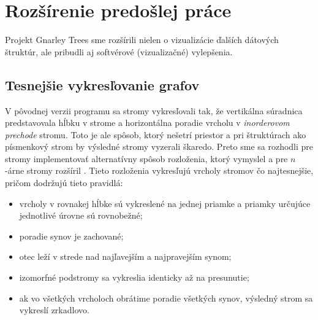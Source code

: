 \section{Rozšírenie predošlej práce}

Projekt Gnarley Trees sme rozšírili nielen o vizualizácie ďalších dátových
štruktúr, ale pribudli aj softvérové (vizualizačné) vylepšenia.

\subsection{Tesnejšie vykresľovanie grafov}
V pôvodnej verzii programu sa stromy vykresľovali tak, že vertikálna súradnica 
predstavovala hĺbku v strome a horizontálna poradie vrcholu v \emph{
inorderovom prechode} stromu. Toto je ale spôsob, ktorý 
nešetrí priestor a pri štruktúrach ako písmenkový strom by výsledné stromy 
vyzerali škaredo. Preto sme sa rozhodli pre stromy implementovať 
alternatívny spôsob rozloženia, ktorý vymyslel \citet{reingold} a pre $n$-árne 
stromy rozšíril \citet{walker}. Tieto rozloženia vykresľujú vrcholy stromov čo 
najtesnejšie, pričom dodržujú tieto pravidlá: 
\begin{itemize} 
\item vrcholy v rovnakej hĺbke sú vykreslené na jednej priamke a priamky 
určujúce jednotlivé úrovne sú rovnobežné; 
\item poradie synov je zachované; 
\item otec leží v strede nad najľavejším a najpravejším synom; 
\item izomorfné podstromy sa vykreslia identicky až na presunutie;
\item ak vo všetkých vrcholoch obrátime poradie všetkých synov, výsledný strom 
sa vykreslí zrkadlovo.
\end{itemize}

